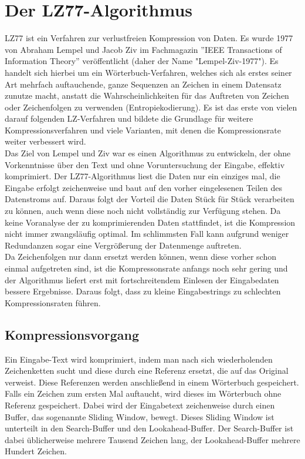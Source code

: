 \documentclass[10pt, a4paper]{article}
\begin{document}
\newpage
\section{Der LZ77-Algorithmus}
LZ77 ist ein Verfahren zur verlustfreien Kompression von Daten. Es wurde 1977 von Abraham Lempel und Jacob Ziv im Fachmagazin ''IEEE Transactions of Information Theory'' veröffentlicht (daher der Name "Lempel-Ziv-1977"). Es handelt sich hierbei um ein Wörterbuch-Verfahren, welches sich als erstes seiner Art mehrfach auftauchende, ganze Sequenzen an Zeichen in einem Datensatz zunutze macht, anstatt die Wahrscheinlichkeiten für das Auftreten von Zeichen oder Zeichenfolgen zu verwenden (Entropiekodierung). Es ist das erste von vielen darauf folgenden LZ-Verfahren und bildete die Grundlage für weitere Kompressionsverfahren und viele Varianten, mit denen die Kompressionsrate weiter verbessert wird. \\

\noindent
Das Ziel von Lempel und Ziv war es einen Algorithmus zu entwickeln, der ohne Vorkenntnisse über den Text und ohne Voruntersuchung der Eingabe, effektiv komprimiert. Der LZ77-Algorithmus liest die Daten nur ein einziges mal, die Eingabe erfolgt zeichenweise und baut auf den vorher eingelesenen Teilen des Datenstroms auf. Daraus folgt der Vorteil die Daten Stück für Stück verarbeiten zu können, auch wenn diese noch nicht vollständig zur Verfügung stehen. Da keine Voranalyse der zu komprimierenden Daten stattfindet, ist die Kompression nicht immer zwangsläufig optimal. Im schlimmsten Fall kann aufgrund weniger Redundanzen sogar eine Vergrößerung der Datenmenge auftreten. \\

\noindent
Da Zeichenfolgen nur dann ersetzt werden können, wenn diese vorher schon einmal aufgetreten sind, ist die Kompressonsrate anfangs noch sehr gering und der Algorithmus liefert erst mit fortschreitendem Einlesen der Eingabedaten bessere Ergebnisse. Daraus folgt, dass zu kleine Eingabestrings zu schlechten Kompressionsraten führen. \cite{website:uni-duisburg-essen, website:lz77, website:rwth-aachen}

\subsection{Kompressionsvorgang}
Ein Eingabe-Text wird komprimiert, indem man nach sich wiederholenden Zeichenketten sucht und diese durch eine Referenz ersetzt, die auf das Original verweist. Diese Referenzen werden anschließend in einem Wörterbuch gespeichert. Falls ein Zeichen zum ersten Mal auftaucht, wird dieses im Wörterbuch ohne Referenz gespeichert. Dabei wird der Eingabetext zeichenweise durch einen Buffer, das sogenannte Sliding Window, bewegt. Dieses Sliding Window ist unterteilt in den Search-Buffer und den Lookahead-Buffer. Der Search-Buffer ist dabei üblicherweise mehrere Tausend Zeichen lang, der Lookahead-Buffer mehrere Hundert Zeichen. \\
\end{document}
